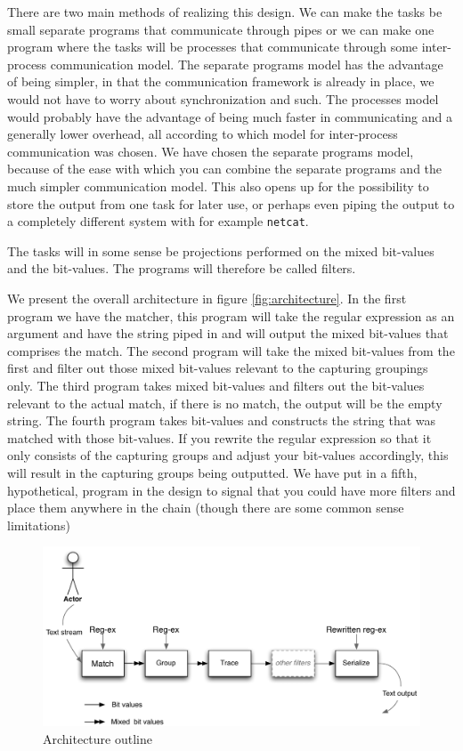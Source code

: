 There are two main methods of realizing this design. We can make the
tasks be small separate programs that communicate through pipes or we
can make one program where the tasks will be processes that
communicate through some inter-process communication model. The
separate programs model has the advantage of being simpler, in that
the communication framework is already in place, we would not have to
worry about synchronization and such. The processes model would
probably have the advantage of being much faster in communicating and
a generally lower overhead, all according to which model for
inter-process communication was chosen. We have chosen the separate
programs model, because of the ease with which you can combine the
separate programs and the much simpler communication model. This also
opens up for the possibility to store the output from one task for
later use, or perhaps even piping the output to a completely different
system with for example \texttt{netcat}. %

The tasks will in some sense be projections performed on the mixed
bit-values and the bit-values. The programs will therefore be called
filters. 



We present the overall architecture in figure
\vref{fig:architecture}. In the first program we have the matcher,
this program will take the regular expression as an argument and have
the string piped in and will output the mixed bit-values that
comprises the match. The second program will take the mixed bit-values
from the first and filter out those mixed bit-values relevant to the
capturing groupings only. The third program takes mixed bit-values and
filters out the bit-values relevant to the actual match, if there is
no match, the output will be the empty string. The fourth program
takes bit-values and constructs the string that was matched with those
bit-values. If you rewrite the regular expression so that it only
consists of the capturing groups and adjust your bit-values
accordingly, this will result in the capturing groups being
outputted. We have put in a fifth, hypothetical, program in the design to signal that
you could have more filters and place them anywhere in the chain (though there are some common sense limitations)
\begin{figure}
  \centering
  \includegraphics[width=\textwidth]{design/architecture.pdf}
  \caption{Architecture outline}
  \label{fig:architecture}
\end{figure}


